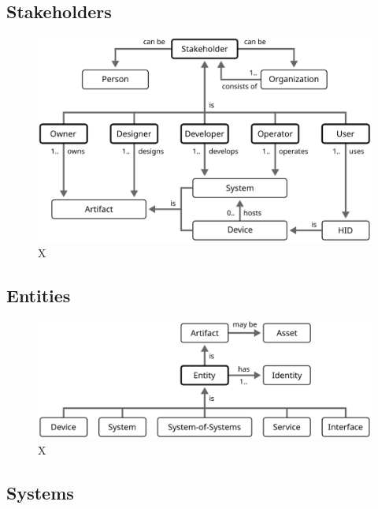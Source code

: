 \subsection{Stakeholders}

\begin{figure}[ht!]
  \centering
  \includegraphics{figures/stakeholder-roles}
  \caption{
    X
  }
  \label{fig:stakeholder-roles}
\end{figure}

\subsection{Entities}

\begin{figure}[ht!]
  \centering
  \includegraphics{figures/entity-classes}
  \caption{
    X
  }
  \label{fig:entity-classes}
\end{figure}

\subsection{Systems}

